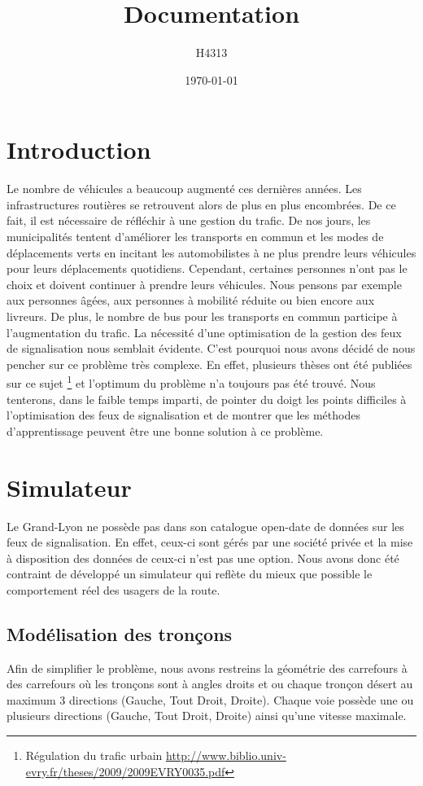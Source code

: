 \documentclass[11pt]{article}
\title{Documentation}
\author{H4313}
\date{\today}
\begin{document}
\maketitle
\tableofcontents
\newpage

\section{Introduction}
Le nombre de véhicules a beaucoup augmenté ces dernières années. Les infrastructures routières se retrouvent alors de plus en plus encombrées. De ce fait, il est nécessaire de réfléchir à une gestion du trafic. De nos jours, les municipalités tentent d'améliorer les transports en commun et les modes de déplacements verts en incitant les automobilistes à ne plus prendre leurs véhicules pour leurs déplacements quotidiens. Cependant, certaines personnes n'ont pas le choix et doivent continuer à prendre leurs véhicules. Nous pensons par exemple aux personnes âgées, aux personnes à mobilité réduite ou bien encore aux livreurs. De plus, le nombre de bus pour les transports en commun participe à l'augmentation du trafic. La nécessité d'une optimisation de la gestion des feux de signalisation nous semblait évidente. C'est pourquoi nous avons décidé de nous pencher sur ce problème très complexe. En effet, plusieurs thèses ont été publiées sur ce sujet \footnote{Régulation du trafic urbain \url{http://www.biblio.univ-evry.fr/theses/2009/2009EVRY0035.pdf}} et l'optimum du problème n'a toujours pas été trouvé. Nous tenterons, dans le faible temps imparti, de pointer du doigt les points difficiles à l'optimisation des feux de signalisation et de montrer que les méthodes d'apprentissage peuvent être une bonne solution à ce problème.

\section{Simulateur}
Le Grand-Lyon ne possède pas dans son catalogue open-date de données sur les feux de signalisation. En effet, ceux-ci sont gérés par une société privée et la mise à disposition des données de ceux-ci n'est pas une option. Nous avons donc été contraint de développé un simulateur qui reflète du mieux que possible le comportement réel des usagers de la route.

\subsection{Modélisation des tronçons}
Afin de simplifier le problème, nous avons restreins la géométrie des carrefours à des carrefours où les tronçons sont à angles droits et ou chaque tronçon désert au maximum 3 directions (Gauche, Tout Droit, Droite). Chaque voie possède une ou plusieurs directions (Gauche, Tout Droit, Droite) ainsi qu'une vitesse maximale. 
\end{document}
